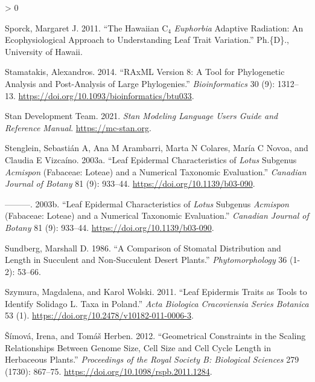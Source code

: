 \documentclass[
  10pt,
]{article}
\newlength{\cslhangindent}
\newenvironment{CSLReferences}[2] %
 {%
  \setlength{\parindent}{0pt}
  \ifodd #1 \everypar{\setlength{\hangindent}{\cslhangindent}}\ignorespaces\fi
  \ifnum #2 > 0
  \setlength{\parskip}{#2\baselineskip}
  \fi
 }%
 {}
\begin{document}
\begin{CSLReferences}{1}{0}
\leavevmode\hypertarget{ref-sporck_hawaiian_2011}{}%
Sporck, Margaret J. 2011. {``The {Hawaiian} {C}\(_{\textrm{4}}\) \emph{Euphorbia} Adaptive Radiation: An Ecophysiological Approach to Understanding Leaf Trait Variation.''} Ph.\{D\}., University of Hawaii.

\leavevmode\hypertarget{ref-stamatakis_raxml_2014}{}%
Stamatakis, Alexandros. 2014. {``{RAxML} Version 8: A Tool for Phylogenetic Analysis and Post-Analysis of Large Phylogenies.''} \emph{Bioinformatics} 30 (9): 1312--13. \url{https://doi.org/10.1093/bioinformatics/btu033}.

\leavevmode\hypertarget{ref-stan_development_team_stan_2021}{}%
Stan Development Team. 2021. \emph{Stan {Modeling} {Language} {Users} {Guide} and {Reference} {Manual}}. \url{https://mc-stan.org}.

\leavevmode\hypertarget{ref-stenglein_leaf_2003}{}%
Stenglein, Sebastián A, Ana M Arambarri, Marta N Colares, María C Novoa, and Claudia E Vizcaíno. 2003a. {``Leaf Epidermal Characteristics of \emph{Lotus} Subgenus \emph{Acmispon} ({Fabaceae}: {Loteae}) and a Numerical Taxonomic Evaluation.''} \emph{Canadian Journal of Botany} 81 (9): 933--44. \url{https://doi.org/10.1139/b03-090}.

\leavevmode\hypertarget{ref-stenglein_leaf_2003-1}{}%
---------. 2003b. {``Leaf Epidermal Characteristics of \emph{Lotus} Subgenus \emph{Acmispon} ({Fabaceae}: {Loteae}) and a Numerical Taxonomic Evaluation.''} \emph{Canadian Journal of Botany} 81 (9): 933--44. \url{https://doi.org/10.1139/b03-090}.

\leavevmode\hypertarget{ref-sundberg_comparison_1986}{}%
Sundberg, Marshall D. 1986. {``A Comparison of Stomatal Distribution and Length in Succulent and Non-Succulent Desert Plants.''} \emph{Phytomorphology} 36 (1-2): 53--66.

\leavevmode\hypertarget{ref-szymura_leaf_2011}{}%
Szymura, Magdalena, and Karol Wolski. 2011. {``Leaf {Epidermis} {Traits} as {Tools} to {Identify} {Solidago} {L}. {Taxa} in {Poland}.''} \emph{Acta Biologica Cracoviensia Series Botanica} 53 (1). \url{https://doi.org/10.2478/v10182-011-0006-3}.

\leavevmode\hypertarget{ref-simova_geometrical_2012}{}%
Šímová, Irena, and Tomáš Herben. 2012. {``Geometrical Constraints in the Scaling Relationships Between Genome Size, Cell Size and Cell Cycle Length in Herbaceous Plants.''} \emph{Proceedings of the Royal Society B: Biological Sciences} 279 (1730): 867--75. \url{https://doi.org/10.1098/rspb.2011.1284}.


\end{CSLReferences}
\end{document}
